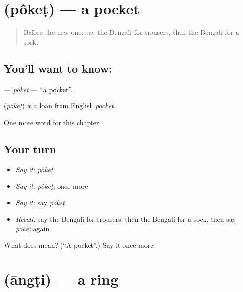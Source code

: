 \section[\texorpdfstring{\bn{পকেট} (pôkeṭ)}{পকেট (pôkeṭ)}]{ (pôkeṭ) — a pocket}

\label{lesson:BN-C85-poket}



\begin{quote}
Before the new one: say the Bengali for trousers, then the Bengali for a sock.
\end{quote}

\subsection*{You'll want to know: }
\textbf{} — \emph{pôkeṭ} — \textquotedblleft{}a pocket\textquotedblright{}.

\begin{cousinweb}
\textbf{} (\emph{pôkeṭ}) is a loan from English \emph{pocket}.
\end{cousinweb}

\begin{grammarlens}[title={What you've built}]
One more word for this chapter.
\end{grammarlens}

\subsection*{Your turn}
\begin{itemize}
\raggedright
  \item \emph{Say it:} \emph{pôkeṭ}
  \item \emph{Say it:} \emph{pôkeṭ}, once more
  \item \emph{Say it:} say \emph{pôkeṭ}
  \item \emph{Recall:} say the Bengali for trousers, then the Bengali for a sock, then say \emph{pôkeṭ} again
\end{itemize}

\begin{tcolorbox}[breakable,colback=teal!4,colframe=teal!35!black,title={Before you move on}]
What does  mean? (\textquotedblleft{}A pocket\textquotedblright{}.) Say it once more.
\end{tcolorbox}
\section[\texorpdfstring{\bn{আংটি} (āngṭi)}{আংটি (āngṭi)}]{ (āngṭi) — a ring}

